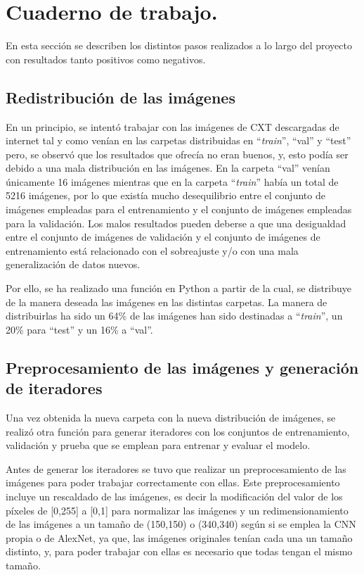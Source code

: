 


\section{Cuaderno de trabajo.}

En esta sección se describen los distintos pasos realizados a lo largo del proyecto con resultados tanto positivos como negativos.

\subsection{Redistribución de las imágenes}

En un principio, se intentó trabajar con las imágenes de CXT descargadas de internet tal y como venían en las carpetas distribuidas en ``\textit{train}'', ``val'' y ``test'' pero, se observó que los resultados que ofrecía no eran buenos, y, esto podía ser debido a una mala distribución en las imágenes. En la carpeta ``val'' venían únicamente 16 imágenes mientras que en la carpeta ``\textit{train}'' había un total de 5216 imágenes, por lo que existía mucho desequilibrio entre el conjunto de imágenes empleadas para el entrenamiento y el conjunto de imágenes empleadas para la validación. Los malos resultados pueden deberse a que una desigualdad entre el conjunto de imágenes de validación y el conjunto de imágenes de entrenamiento está relacionado con el sobreajuste y/o con una mala generalización de datos nuevos.

Por ello, se ha realizado una función en Python a partir de la cual, se distribuye de la manera deseada las imágenes en las distintas carpetas. La manera de distribuirlas ha sido un 64\% de las imágenes han sido destinadas a ``\textit{train}'', un 20\% para ``test'' y un 16\% a ``val''.

\subsection{Preprocesamiento de las imágenes y generación de iteradores}

Una vez obtenida la nueva carpeta con la nueva distribución de imágenes, se realizó otra función para generar iteradores con los conjuntos de entrenamiento, validación y prueba que se emplean para entrenar y evaluar el modelo.

Antes de generar los iteradores se tuvo que realizar un preprocesamiento de las imágenes para poder trabajar correctamente con ellas. Este preprocesamiento incluye un rescaldado de las imágenes, es decir la modificación del valor de los píxeles de [0,255] a [0,1] para normalizar las imágenes y un redimensionamiento de las imágenes a un tamaño de (150,150) o (340,340) según si se emplea la CNN propia o de AlexNet, ya que, las imágenes originales tenían cada una un tamaño distinto, y, para poder trabajar con ellas es necesario que todas tengan el mismo tamaño.

